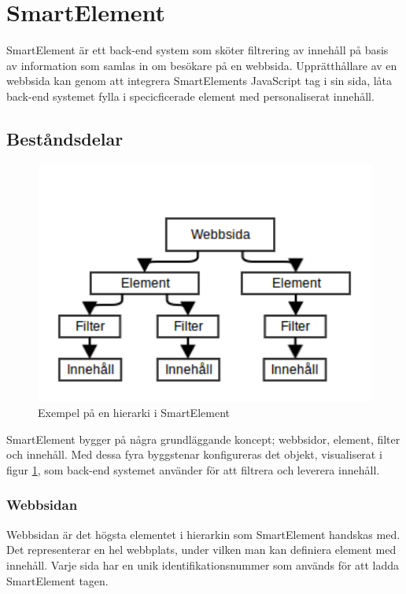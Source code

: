 \section{SmartElement}

SmartElement är ett back-end system som sköter filtrering av innehåll på basis av information som samlas in om besökare på en webbsida. Upprätthållare av en webbsida kan genom att integrera SmartElements JavaScript tag i sin sida, låta back-end systemet fylla i specicficerade element med personaliserat innehåll.

\subsection{Beståndsdelar}

\begin{figure}[h!]
\centering
\includegraphics[width=120mm]{assets/images/smelementdatamodelabstract.png}
\caption{Exempel på en hierarki i SmartElement}
\label{abstractstructure}
\end{figure}

SmartElement bygger på några grundläggande koncept; webbsidor, element, filter och innehåll. Med dessa fyra byggstenar konfigureras det objekt, visualiserat i figur \ref{abstractstructure}, som back-end systemet använder för att filtrera och leverera innehåll.

\subsubsection{Webbsidan}

Webbsidan är det högsta elementet i hierarkin som SmartElement handskas med. Det representerar en hel webbplats, under vilken man kan definiera element med innehåll. Varje sida har en unik identifikationsnummer som används för att ladda SmartElement tagen.

